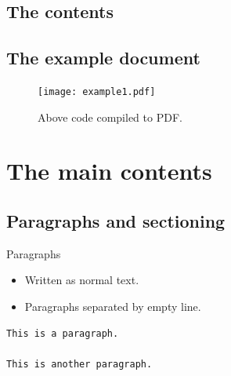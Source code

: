 \begin{frame}[fragile]
  
\end{frame}

\subsection{The contents}

\begin{frame}[fragile]
  
\end{frame}

\subsection{The example document}

\begin{frame}
  \begin{figure}
    \texttt{[image: example1.pdf]}
    \caption{Above code compiled to PDF.}
  \end{figure}
\end{frame}


\section{The main contents}

\subsection{Paragraphs and sectioning}

\begin{frame}[fragile]
  \begin{block}{Paragraphs}
    \begin{itemize}
      \item Written as normal text.

      \item Paragraphs separated by empty line.
    \end{itemize}
  \end{block}

  \pause

  \begin{example}
  \begin{lstlisting}
This is a paragraph.

This is another paragraph.
  \end{lstlisting}
  \end{example}
\end{frame}

